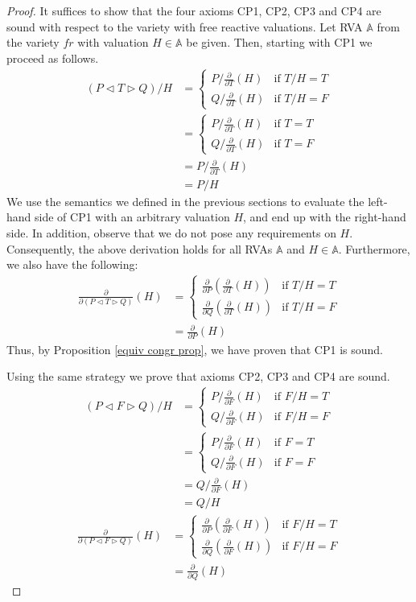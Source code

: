 \documentclass[a4paper,twoside,openright]{report}
\newcommand{\dd}[1]{\frac{\partial}{\partial #1}}
\newcommand{\lef}{\ensuremath{\triangleleft}}
\newcommand{\rig}{\ensuremath{\triangleright}}
\begin{document}
\begin{proof}
It suffices to show that the four axioms CP1, CP2, CP3 and CP4 are sound with respect to the variety with free reactive valuations. Let RVA $\mathbb{A}$ from the variety $fr$ with valuation $H\in\mathbb{A}$ be given. Then, starting with CP1 we proceed as follows.
\begin{align*}
(P\lef T\rig Q)/H
&=\begin{cases}
P/\dd T(H)&\text{if $T/H=T$}\\
Q/\dd T(H)&\text{if $T/H=F$}
\end{cases}\\
&=\begin{cases}
P/\dd T(H)&\text{if $T=T$}\\
Q/\dd T(H)&\text{if $T=F$}
\end{cases}\\
&=P/\dd T(H)\\
&=P/H
\end{align*}
We use the semantics we defined in the previous sections to evaluate the left-hand side of CP1 with an arbitrary valuation $H$, and end up with the right-hand side. In addition, observe that we do not pose any requirements on $H$. Consequently, the above derivation holds for all RVAs $\mathbb{A}$ and $H\in\mathbb{A}$. 
Furthermore, we also have the following:
\begin{align*}
\dd{(P\lef T\rig Q)}(H)
&=\begin{cases}
\dd P(\dd T(H)) & \text{if $T/H=T$}\\
\dd Q(\dd T(H)) & \text{if $T/H=F$}
\end{cases}\\
&=\dd P(H)
\end{align*}
Thus, by Proposition \ref{equiv congr prop}, we have proven that CP1 is sound.

Using the same strategy we prove that axioms CP2, CP3 and CP4 are sound.
\begin{align*}
(P\lef F\rig Q)/H
&=\begin{cases}
P/\dd F(H)&\text{if $F/H=T$}\\
Q/\dd F(H)&\text{if $F/H=F$}
\end{cases}\\
&=\begin{cases}
P/\dd F(H)&\text{if $F=T$}\\
Q/\dd F(H)&\text{if $F=F$}
\end{cases}\\
&=Q/\dd F(H)\\
&=Q/H
\end{align*}
\begin{align*}
\dd{(P\lef F\rig Q)}(H)
&=\begin{cases}
\dd P(\dd F(H)) & \text{if $F/H=T$}\\
\dd Q(\dd F(H)) & \text{if $F/H=F$}
\end{cases}\\
&=\dd Q(H)
\end{align*}


\end{proof}
\end{document}
